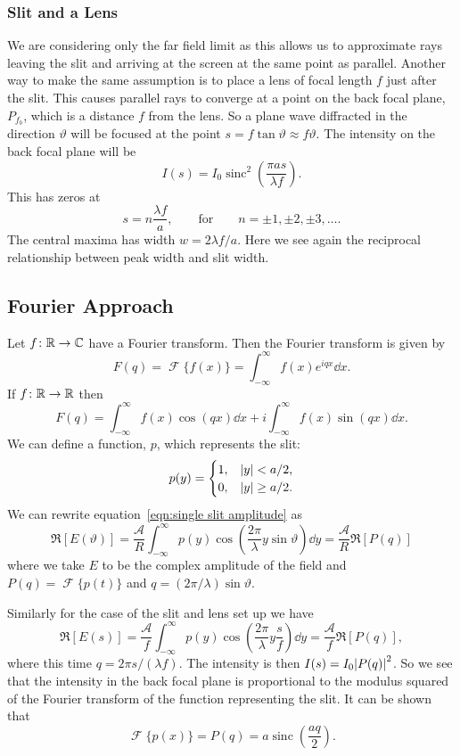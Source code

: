 \documentclass[a4paper]{article}
\newcommand{\FT}{\mathop{\mathcal{F}}}
\DeclareMathOperator{\sinc}{sinc}
\begin{document}
    \subsubsection{Slit and a Lens}
    We are considering only the far field limit as this allows us to approximate rays leaving the slit and arriving at the screen at the same point as parallel.
    Another way to make the same assumption is to place a lens of focal length \(f\) just after the slit.
    This causes parallel rays to converge at a point on the back focal plane, \(P_{f_b}\), which is a distance \(f\) from the lens.
    So a plane wave diffracted in the direction \(\vartheta\) will be focused at the point \(s = f\tan\vartheta \approx f\vartheta\).
    The intensity on the back focal plane will be
    \[I(s) = I_0\sinc^2\left( \frac{\pi as}{\lambda f} \right).\]
    This has zeros at
    \[s = n\frac{\lambda f}{a}, \qquad\text{for}\qquad n = \pm 1,\pm 2, \pm 3, \dotsc.\]
    The central maxima has width \(w = 2\lambda f/a\).
    Here we see again the reciprocal relationship between peak width and slit width.
    
    \subsection{Fourier Approach}
    Let \(f\colon\mathbb{R}\to\mathbb{C}\) have a Fourier transform.
    Then the Fourier transform is given by
    \[F(q) = \FT\{f(x)\} = \int_{-\infty}^{\infty} f(x) e^{iqx} \dd{x}.\]
    If \(f\colon\mathbb{R}\to\mathbb{R}\) then
    \[F(q) = \int_{-\infty}^{\infty} f(x)\cos(qx) \dd{x} + i\int_{-\infty}^{\infty} f(x)\sin(qx) \dd{x}.\]
    We can define a function, \(p\), which represents the slit:
    \[
        p(y) = 
        \begin{cases}
            1, & \abs{y} < a/2,\\
            0, & \abs{y} \ge a/2.
        \end{cases}
    \]
    We can rewrite equation~\ref{eqn:single slit amplitude} as
    \[\Re[E(\vartheta)] = \frac{\mathcal{A}}{R} \int_{-\infty}^{\infty} p(y)\cos\left( \frac{2\pi}{\lambda}y\sin\vartheta \right) \dd{y} = \frac{\mathcal{A}}{R}\Re[P(q)]\]
    where we take \(E\) to be the complex amplitude of the field and \(P(q) = \FT\{p(t)\}\) and \(q = (2\pi/\lambda)\sin\vartheta\).
    
    Similarly for the case of the slit and lens set up we have
    \[\Re[E(s)] = \frac{\mathcal{A}}{f} \int_{-\infty}^{\infty} p(y)\cos\left( \frac{2\pi}{\lambda}y\frac{s}{f} \right) \dd{y} = \frac{\mathcal{A}}{f}\Re[P(q)],\]
    where this time \(q = 2\pi s/(\lambda f)\).
    The intensity is then \(I(s) = I_0\abs{P(q)}^2\).
    So we see that the intensity in the back focal plane is proportional to the modulus squared of the Fourier transform of the function representing the slit.
    It can be shown that
    \[\FT\{p(x)\} = P(q) = a\sinc\left( \frac{aq}{2} \right).\]
    
\end{document}
